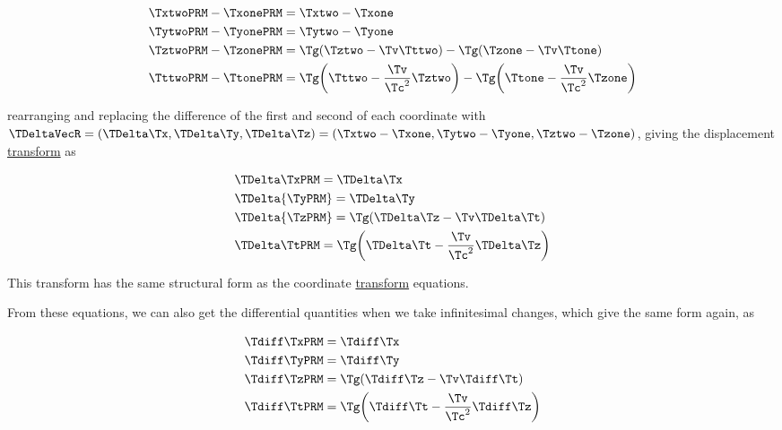 \begin{equation}
	\begin{aligned}
		 & \TxtwoPRM -\TxonePRM  = \Txtwo -\Txone                                                                                          \\
		 & \TytwoPRM -\TyonePRM  = \Tytwo -\Tyone                                                                                          \\
		 & \TztwoPRM -\TzonePRM  = \Tg  ( \Tztwo - \Tv  \Tttwo )-{\Tg } ( \Tzone - \Tv  \Ttone )                                               \\
		 & \TttwoPRM -\TtonePRM  = \Tg  \bigg( \Tttwo -\frac{\Tv }{ \Tc ^2} \Tztwo  \bigg)-{\Tg } \bigg( \Ttone -\frac{\Tv }{\Tc ^2} \Tzone  \bigg)
	\end{aligned}
\end{equation}

rearranging and replacing the difference of the first and second of each coordinate with ${\TDeltaVecR  } = ({\TDelta }\Tx ,{\TDelta }\Ty ,{\TDelta }\Tz ) = (\Txtwo -\Txone ,\Tytwo -\Tyone ,\Tztwo -\Tzone )$, giving the displacement \hyperlink{def-transform}{transform} as

\begin{equation}
	\label{eq: interval of Coordinates}
	\begin{aligned}
		 & \TDelta  \TxPRM  = {\TDelta  \Tx }                                                   \\
		 & \TDelta  {\TyPRM  } = {\TDelta  \Ty }                                                 \\
		 & \TDelta  {\TzPRM  } = \Tg  ( {\TDelta  \Tz }- \Tv  \TDelta  \Tt )                       \\
		 & {\TDelta  \TtPRM  } = \Tg  \bigg( \TDelta  \Tt -\frac{\Tv }{ \Tc ^2} {\TDelta  \Tz } \bigg)
	\end{aligned}
\end{equation}

This transform has the same structural form as the coordinate \hyperlink{def-transform}{transform} equations.

From these equations, we can also get the differential quantities when we take infinitesimal changes, which give the same form again, as

\begin{equation}
	\label{eq: infinitesimal interval of Coordinates}
	\begin{aligned}
		 & {\Tdiff \TxPRM  } = {\Tdiff \Tx }                                        \\
		 & {\Tdiff \TyPRM  } = {\Tdiff \Ty }                                        \\
		 & {\Tdiff \TzPRM  } = \Tg  (\Tdiff \Tz - {\Tv }\Tdiff \Tt )                        \\
		 & {\Tdiff \TtPRM  } = \Tg  \bigg(\Tdiff \Tt -\frac{\Tv }{ \Tc ^2} \Tdiff \Tz  \bigg)
	\end{aligned}
\end{equation}

